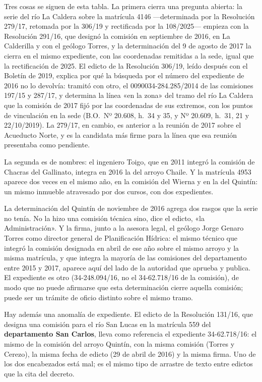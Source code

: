 \begin{cautela}
Tres cosas se siguen de esta tabla. La primera cierra una pregunta abierta: la serie del río La Caldera sobre la matrícula 4146 ---determinada por la Resolución 279/17, retomada por la 306/19 y rectificada por la 108/2025--- empieza con la Resolución 291/16, que designó la comisión en septiembre de 2016, en La Calderilla y con el geólogo Torres, y la determinación del 9 de agosto de 2017 la cierra en el mismo expediente, con las coordenadas remitidas a la sede, igual que la rectificación de 2025.  El edicto de la Resolución 306/19, leído después con el Boletín de 2019, explica por qué la búsqueda por el número del expediente de 2016 no lo devolvía: tramitó con otro, el 0090034-284.285/2014 de las comisiones 197/15 y 287/17, y determina la línea «en la zona» del tramo del río La Caldera que la comisión de 2017 fijó por las coordenadas de sus extremos, con los puntos de vinculación en la sede (B.O.\ Nº 20.608, h.\ 34 y 35, y Nº 20.609, h.\ 31, 21 y 22/10/2019). La 279/17, en cambio, es anterior a la reunión de 2017 sobre el Acueducto Norte, y es la candidata más firme para la línea que esa reunión presentaba como pendiente.

La segunda es de nombres: el ingeniero Toigo, que en 2011 integró la comisión de Chacras del Gallinato, integra en 2016 la del arroyo Chaile. Y la matrícula 4953 aparece dos veces en el mismo año, en la comisión del Wierna y en la del Quintín: un mismo inmueble atravesado por dos cursos, con dos expedientes.

La determinación del Quintín de noviembre de 2016 agrega dos rasgos que la serie no tenía. No la hizo una comisión técnica sino, dice el edicto, «la Administración». Y la firma, junto a la asesora legal, el geólogo Jorge Genaro Torres como director general de Planificación Hídrica: el mismo técnico que integró la comisión designada en abril de ese año sobre el mismo arroyo y la misma matrícula, y que integra la mayoría de las comisiones del departamento entre 2015 y 2017, aparece aquí del lado de la autoridad que aprueba y publica. El expediente es otro (34-248.094/16, no el 34-62.718/16 de la comisión), de modo que no puede afirmarse que esta determinación cierre aquella comisión; puede ser un trámite de oficio distinto sobre el mismo tramo.

Hay además una anomalía de expediente. El edicto de la Resolución 131/16, que designa una comisión para el río San Lucas en la matrícula 559 del \textbf{departamento San Carlos}, lleva como referencia el expediente 34-62.718/16: el mismo de la comisión del arroyo Quintín, con la misma comisión (Torres y Cerezo), la misma fecha de edicto (29 de abril de 2016) y la misma firma. Uno de los dos encabezados está mal; es el mismo tipo de arrastre de texto entre edictos que la cita del decreto.


\end{cautela}
